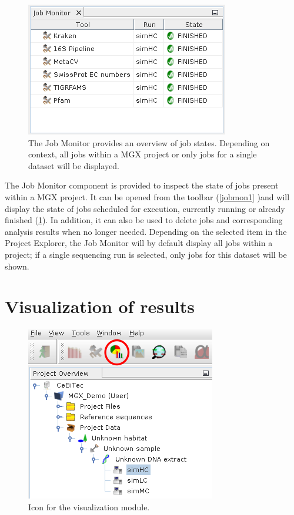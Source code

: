 \begin{figure}[H]
\centering
\includegraphics[width=.6\textwidth]{img/mgx/JobMon}
\caption[Job monitor]{The Job Monitor provides an overview of job states. Depending on context, all jobs
within a MGX project or only jobs for a single dataset will be displayed.}
\label{jobmon2}
\end{figure}

The Job Monitor component is provided to inspect the state of jobs present within a MGX project.
It can be opened from the toolbar (\ref{jobmon1} )and will display the state of jobs scheduled for execution,
currently running or already finished (\ref{jobmon2}). In addition, it can also be used to delete jobs and
corresponding analysis results when no longer needed. Depending on the selected item in the
Project Explorer, the Job Monitor will by default display all jobs within a project; if a single
sequencing run is selected, only jobs for this dataset will be shown.

\section{Visualization of results}

\begin{figure}[H]
\centering
\includegraphics[width=.6\textwidth]{img/mgx/VizOpen}
\caption[Visualization]{Icon for the visualization module.}
\label{viz1}
\end{figure}

